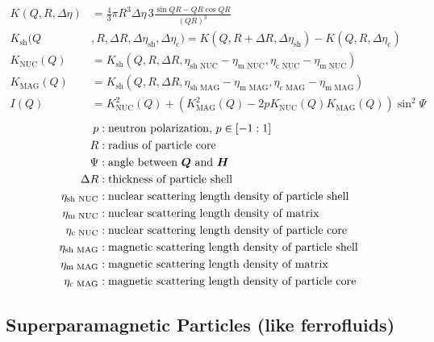 \begin{align}
 K(Q,R,\Delta\eta) & = \frac{4}{3}\pi R^3 \Delta\eta \, 3 \frac{\sin QR - QR \cos
 QR}{(QR)^3} \\
   K_\text{sh}(Q&,R,\Delta R,\Delta\eta_\text{sh},\Delta\eta_\text{c}) = K(Q,R+\Delta R,\Delta\eta_\text{sh})-K(Q,R,\Delta\eta_\text{c})\\
   K_\text{NUC}(Q) &=
   K_\text{sh}(Q,R,\Delta R,\eta_{\text{sh NUC}}-\eta_{\text{m NUC}}, \eta_{\text{c NUC}}-\eta_{\text{m NUC}})\\
   K_\text{MAG}(Q) &=
   K_\text{sh}(Q,R,\Delta R,\eta_{\text{sh MAG}}-\eta_{\text{m MAG}}, \eta_{\text{c MAG}}-\eta_{\text{m MAG}})\\
   I(Q) &= K^2_\text{NUC}(Q)+\left(K^2_\text{MAG}(Q) - 2p
    K_\text{NUC}(Q)K_\text{MAG}(Q)\right) \sin^2\Psi
\end{align}
\begin{align}
p            &: \text{neutron polarization, } p\in[-1:1] \nonumber \\
R            &: \text{radius of particle core} \nonumber \\
\Psi         &: \text{angle between $\BM{Q}$ and $\BM{H}$} \nonumber \\
\Delta R     &: \text{thickness of particle shell} \nonumber \\
\eta_{\text{sh NUC}} &: \text{nuclear scattering length density of particle shell} \nonumber \\
\eta_{\text{m NUC}}  &: \text{nuclear scattering length density of matrix} \nonumber \\
\eta_{\text{c NUC}}  &: \text{nuclear scattering length density of particle core} \nonumber \\
\eta_{\text{sh MAG}} &: \text{magnetic scattering length density of particle shell} \nonumber \\
\eta_{\text{m MAG}}  &: \text{magnetic scattering length density of matrix} \nonumber \\
\eta_{\text{c MAG}}  &: \text{magnetic scattering length density
of particle core} \nonumber
\end{align}


\clearpage
\subsection{Superparamagnetic Particles (like ferrofluids)}~\\

